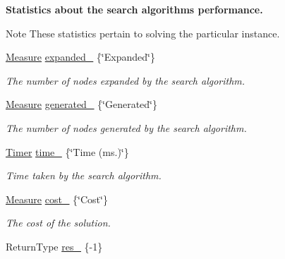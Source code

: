 \begin{Indent}{\bf Statistics about the search algorithm\textquotesingle{}s performance.}\par
{\em \begin{DoxyNote}{Note}
These statistics pertain to solving the particular instance. 
\end{DoxyNote}
}\begin{DoxyCompactItemize}
\item 
\hyperlink{structMeasure}{Measure} \hyperlink{structAlgorithm_ade53ec86bea2abe58fddfc5bb7f4653f}{expanded\+\_\+} \{\char`\"{}Expanded\char`\"{}\}\hypertarget{structAlgorithm_ade53ec86bea2abe58fddfc5bb7f4653f}{}\label{structAlgorithm_ade53ec86bea2abe58fddfc5bb7f4653f}

\begin{DoxyCompactList}\small\item\em The number of nodes expanded by the search algorithm. \end{DoxyCompactList}\item 
\hyperlink{structMeasure}{Measure} \hyperlink{structAlgorithm_a74e9a881f9b0b93129b0e349d425539d}{generated\+\_\+} \{\char`\"{}Generated\char`\"{}\}\hypertarget{structAlgorithm_a74e9a881f9b0b93129b0e349d425539d}{}\label{structAlgorithm_a74e9a881f9b0b93129b0e349d425539d}

\begin{DoxyCompactList}\small\item\em The number of nodes generated by the search algorithm. \end{DoxyCompactList}\item 
\hyperlink{structTimer}{Timer} \hyperlink{structAlgorithm_abec349e0d26ccd4dbc014c19114b0559}{time\+\_\+} \{\char`\"{}Time (ms.)\char`\"{}\}\hypertarget{structAlgorithm_abec349e0d26ccd4dbc014c19114b0559}{}\label{structAlgorithm_abec349e0d26ccd4dbc014c19114b0559}

\begin{DoxyCompactList}\small\item\em Time taken by the search algorithm. \end{DoxyCompactList}\item 
\hyperlink{structMeasure}{Measure} \hyperlink{structAlgorithm_aac9e60b0069aa91585e3c832484d328b}{cost\+\_\+} \{\char`\"{}Cost\char`\"{}\}\hypertarget{structAlgorithm_aac9e60b0069aa91585e3c832484d328b}{}\label{structAlgorithm_aac9e60b0069aa91585e3c832484d328b}

\begin{DoxyCompactList}\small\item\em The cost of the solution. \end{DoxyCompactList}\item 
Return\+Type \hyperlink{structAlgorithm_a856b28c6c118d0ea62970bc889d400fc}{res\+\_\+} \{-\/1\}\hypertarget{structAlgorithm_a856b28c6c118d0ea62970bc889d400fc}{}\label{structAlgorithm_a856b28c6c118d0ea62970bc889d400fc}


\end{DoxyCompactItemize}
\end{Indent}
